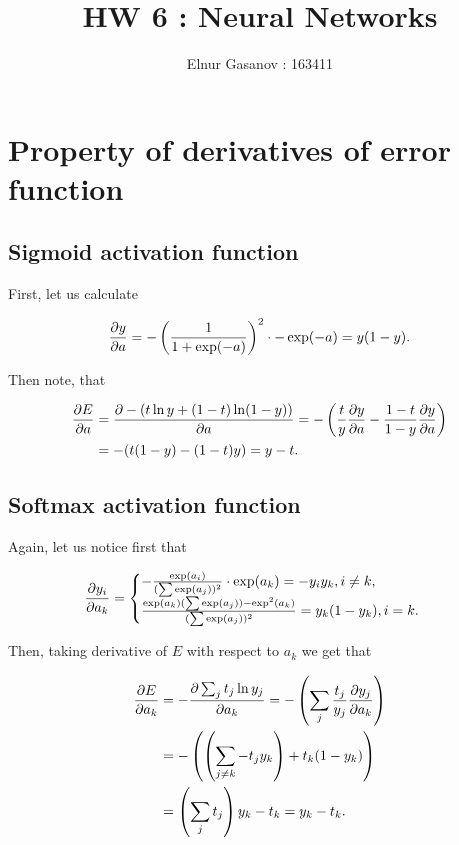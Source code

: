 \documentclass{article}
\author{Elnur Gasanov : 163411}
\title{HW 6 : Neural Networks}
\begin{document}
\maketitle

\section{Property of derivatives of error function}

\subsection{Sigmoid activation function}

First, let us calculate 

\begin{align}
\pdv{y}{a} = -\left(\frac{1}{1 + \exp(-a)}\right)^2 \cdot - \exp (-a) = y (1 - y).
\end{align}

Then note, that

\begin{align*}
\pdv{E}{a} &= \pdv{-(t \ln y + (1-t) \ln (1-y))}{a} = - \left(\frac{t}{y} \pdv{y}{a} - \frac{1-t}{1-y} \pdv{y}{a}\right) \\&= - (t(1-y) -(1-t)y) = y-t.
\end{align*}

\subsection{Softmax activation function}

Again, let us notice first that

\begin{align*}
\pdv{y_i}{a_k} = \begin{cases}
	-\frac{\exp(a_i)}{(\sum \exp(a_j))^2} \cdot \exp(a_k) = -y_i y_k, i \neq k, \\
	\frac{\exp(a_k) (\sum \exp(a_j)) - \exp^2(a_k)  }{(\sum \exp(a_j))^2} = y_k (1 - y_k), i = k.
	\end{cases}
\end{align*}

Then, taking derivative of $E$ with respect to $a_k$ we get that

\begin{align*}
\pdv{E}{a_k}& = - \pdv{\sum_j t_j \ln y_j}{a_k} = - \left(\sum_j \frac{t_j}{y_j} \pdv{y_j}{a_k}\right) \\
& = - \left(\left(\sum_{j \neq k} - t_j y_k \right) + t_k (1 - y_k) \right)\\
& = \left( \sum_j t_j \right) y_k - t_k = y_k - t_k.
\end{align*}
\end{document}
